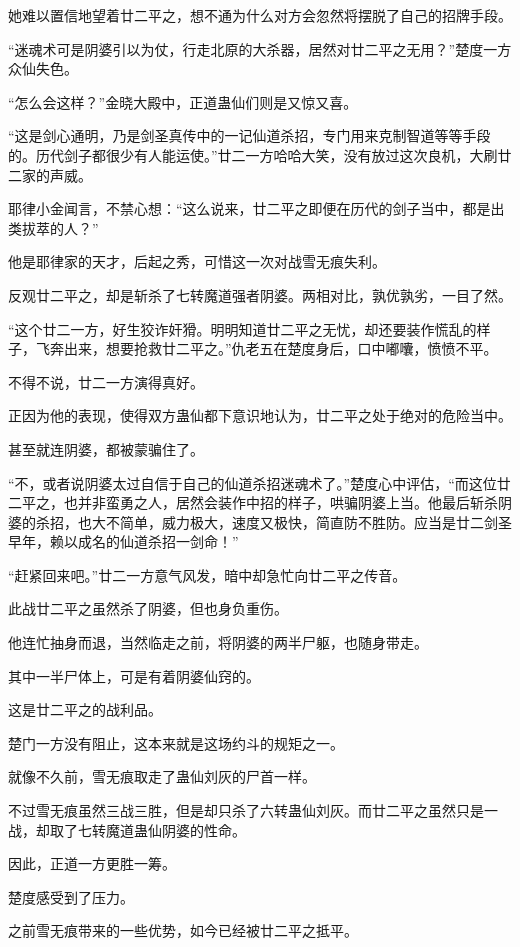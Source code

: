 \begin{this_body}
她难以置信地望着廿二平之，想不通为什么对方会忽然将摆脱了自己的招牌手段。

“迷魂术可是阴婆引以为仗，行走北原的大杀器，居然对廿二平之无用？”楚度一方众仙失色。

“怎么会这样？”金晓大殿中，正道蛊仙们则是又惊又喜。

“这是剑心通明，乃是剑圣真传中的一记仙道杀招，专门用来克制智道等等手段的。历代剑子都很少有人能运使。”廿二一方哈哈大笑，没有放过这次良机，大刷廿二家的声威。

耶律小金闻言，不禁心想：“这么说来，廿二平之即便在历代的剑子当中，都是出类拔萃的人？”

他是耶律家的天才，后起之秀，可惜这一次对战雪无痕失利。

反观廿二平之，却是斩杀了七转魔道强者阴婆。两相对比，孰优孰劣，一目了然。

“这个廿二一方，好生狡诈奸猾。明明知道廿二平之无忧，却还要装作慌乱的样子，飞奔出来，想要抢救廿二平之。”仇老五在楚度身后，口中嘟囔，愤愤不平。

不得不说，廿二一方演得真好。

正因为他的表现，使得双方蛊仙都下意识地认为，廿二平之处于绝对的危险当中。

甚至就连阴婆，都被蒙骗住了。

“不，或者说阴婆太过自信于自己的仙道杀招迷魂术了。”楚度心中评估，“而这位廿二平之，也并非蛮勇之人，居然会装作中招的样子，哄骗阴婆上当。他最后斩杀阴婆的杀招，也大不简单，威力极大，速度又极快，简直防不胜防。应当是廿二剑圣早年，赖以成名的仙道杀招一剑命！”

“赶紧回来吧。”廿二一方意气风发，暗中却急忙向廿二平之传音。

此战廿二平之虽然杀了阴婆，但也身负重伤。

他连忙抽身而退，当然临走之前，将阴婆的两半尸躯，也随身带走。

其中一半尸体上，可是有着阴婆仙窍的。

这是廿二平之的战利品。

楚门一方没有阻止，这本来就是这场约斗的规矩之一。

就像不久前，雪无痕取走了蛊仙刘灰的尸首一样。

不过雪无痕虽然三战三胜，但是却只杀了六转蛊仙刘灰。而廿二平之虽然只是一战，却取了七转魔道蛊仙阴婆的性命。

因此，正道一方更胜一筹。

楚度感受到了压力。

之前雪无痕带来的一些优势，如今已经被廿二平之抵平。


\end{this_body}
